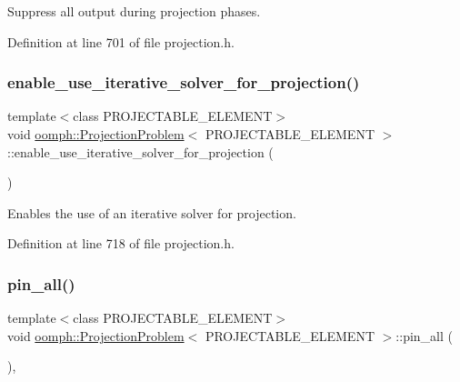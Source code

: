 Suppress all output during projection phases. 



Definition at line 701 of file projection.\+h.

\mbox{\label{classoomph_1_1ProjectionProblem_aefda55d76d58a951ef6714cbb998e358}} 
\subsubsection{\texorpdfstring{enable\+\_\+use\+\_\+iterative\+\_\+solver\+\_\+for\+\_\+projection()}{enable\_use\_iterative\_solver\_for\_projection()}}
{\footnotesize\ttfamily template$<$class P\+R\+O\+J\+E\+C\+T\+A\+B\+L\+E\+\_\+\+E\+L\+E\+M\+E\+NT$>$ \\
void \hyperlink{classoomph_1_1ProjectionProblem}{oomph\+::\+Projection\+Problem}$<$ P\+R\+O\+J\+E\+C\+T\+A\+B\+L\+E\+\_\+\+E\+L\+E\+M\+E\+NT $>$\+::enable\+\_\+use\+\_\+iterative\+\_\+solver\+\_\+for\+\_\+projection (\begin{DoxyParamCaption}{ }\end{DoxyParamCaption})\hspace{0.3cm}{\ttfamily [inline]}}



Enables the use of an iterative solver for projection. 



Definition at line 718 of file projection.\+h.

\mbox{\label{classoomph_1_1ProjectionProblem_a9c24751d48a454956517a8541c423cf2}} 
\subsubsection{\texorpdfstring{pin\+\_\+all()}{pin\_all()}}
{\footnotesize\ttfamily template$<$class P\+R\+O\+J\+E\+C\+T\+A\+B\+L\+E\+\_\+\+E\+L\+E\+M\+E\+NT$>$ \\
void \hyperlink{classoomph_1_1ProjectionProblem}{oomph\+::\+Projection\+Problem}$<$ P\+R\+O\+J\+E\+C\+T\+A\+B\+L\+E\+\_\+\+E\+L\+E\+M\+E\+NT $>$\+::pin\+\_\+all (\begin{DoxyParamCaption}{ }\end{DoxyParamCaption})\hspace{0.3cm}{\ttfamily [inline]}, {\ttfamily [private]}}



